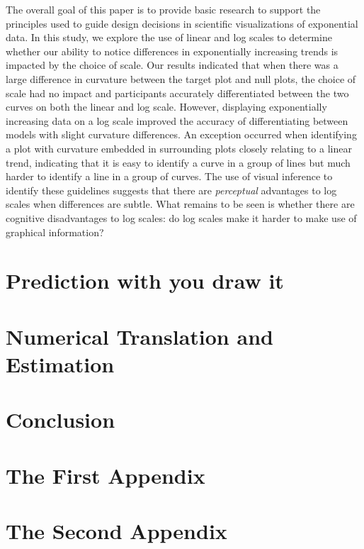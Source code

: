 \documentclass[print]{nuthesis}
\begin{document}
The overall goal of this paper is to provide basic research to support the principles used to guide design decisions in scientific visualizations of exponential data.
In this study, we explore the use of linear and log scales to determine whether our ability to notice differences in exponentially increasing trends is impacted by the choice of scale.
Our results indicated that when there was a large difference in curvature between the target plot and null plots, the choice of scale had no impact and participants accurately differentiated between the two curves on both the linear and log scale.
However, displaying exponentially increasing data on a log scale improved the accuracy of differentiating between models with slight curvature differences.
An exception occurred when identifying a plot with curvature embedded in surrounding plots closely relating to a linear trend, indicating that it is easy to identify a curve in a group of lines but much harder to identify a line in a group of curves.
The use of visual inference to identify these guidelines suggests that there are \emph{perceptual} advantages to log scales when differences are subtle.
What remains to be seen is whether there are cognitive disadvantages to log scales: do log scales make it harder to make use of graphical information?

\hypertarget{youdrawit}{%
\chapter{Prediction with you draw it}\label{youdrawit}}

\hypertarget{estimation}{%
\chapter{Numerical Translation and Estimation}\label{estimation}}

\hypertarget{conclusion}{%
\chapter{Conclusion}\label{conclusion}}

\appendix

\hypertarget{the-first-appendix}{%
\chapter{The First Appendix}\label{the-first-appendix}}

\hypertarget{the-second-appendix}{%
\chapter{The Second Appendix}\label{the-second-appendix}}
\end{document}
